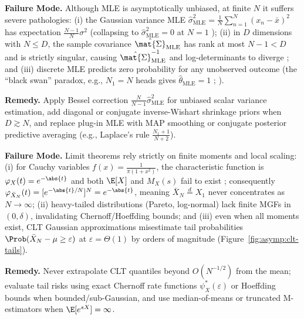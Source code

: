 \documentclass[../../../../master.tex]{subfiles}
\begin{document}
\begin{pitfall}
\textbf{Failure Mode.} Although MLE is asymptotically unbiased, at finite $N$ it suffers severe pathologies: (i) the Gaussian variance MLE $\hat{\sigma}_{\mathrm{MLE}}^2 = \frac{1}{N}\sum_{n=1}^N (x_n - \bar{x})^2$ has expectation $\frac{N-1}{N}\sigma^2$ (collapsing to $\hat{\sigma}_{\mathrm{MLE}}^2 = 0$ at $N=1$ ); (ii) in $D$ dimensions with $N \le D$, the sample covariance $\hat{\mat{\Sigma}}_{\mathrm{MLE}}$ has rank at most $N-1 < D$ and is strictly singular, causing $\hat{\mat{\Sigma}}_{\mathrm{MLE}}^{-1}$ and log-determinants to diverge ; and (iii) discrete MLE predicts zero probability for any unobserved outcome (the ``black swan'' paradox, e.g., $N_1 = N$ heads gives $\hat{\theta}_{\mathrm{MLE}} = 1$ ; ).

\textbf{Remedy.} Apply Bessel correction $\frac{N}{N-1}\hat{\sigma}_{\mathrm{MLE}}^2$ for unbiased scalar variance estimation, add diagonal or conjugate inverse-Wishart shrinkage priors when $D \gtrsim N$, and replace plug-in MLE with MAP smoothing or conjugate posterior predictive averaging (e.g., Laplace's rule $\frac{N_1 + 1}{N + 2}$).
\end{pitfall}

\begin{pitfall}
\textbf{Failure Mode.} Limit theorems rely strictly on finite moments and local scaling: (i) for Cauchy variables $f(x) = \frac{1}{\pi(1+x^2)}$, the characteristic function is $\varphi_X(t) = e^{-\abs{t}}$ and both $\E[X]$ and $M_X(s)$ fail to exist ; consequently $\varphi_{\bar{X}_N}(t) = [e^{-\abs{t}/N}]^N = e^{-\abs{t}}$, meaning $\bar{X}_N \stackrel{d}{=} X_1$ never concentrates as $N \to \infty$; (ii) heavy-tailed distributions (Pareto, log-normal) lack finite MGFs in $(0, \delta)$, invalidating Chernoff/Hoeffding bounds; and (iii) even when all moments exist, CLT Gaussian approximations misestimate tail probabilities $\Prob(\bar{X}_N - \mu \ge \varepsilon)$ at $\varepsilon = \Theta(1)$ by orders of magnitude (Figure~\ref{fig:asymp:clt-tails}).

\textbf{Remedy.} Never extrapolate CLT quantiles beyond $O(N^{-1/2})$ from the mean; evaluate tail risks using exact Chernoff rate functions $\psi_X^*(\varepsilon)$ or Hoeffding bounds when bounded/sub-Gaussian, and use median-of-means or truncated M-estimators when $\E[e^{sX}] = \infty$.
\end{pitfall}
\end{document}
